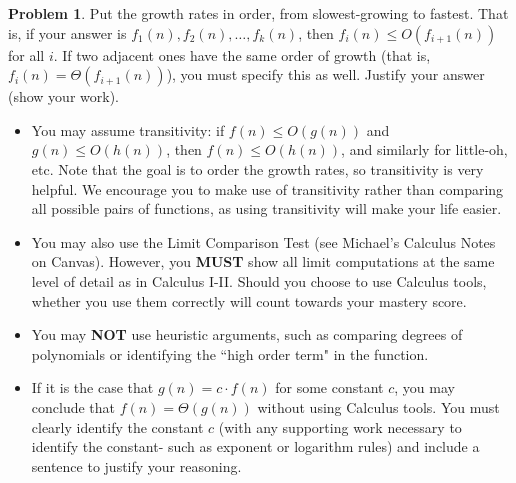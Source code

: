 \documentclass[11pt]{article}
\theoremstyle{definition}
\theoremstyle{definition}
\newtheorem{problem}{Problem}
\theoremstyle{definition}
\begin{document}
\begin{problem}
Put the growth rates in order, from slowest-growing to fastest. That is, if your answer is $f_1(n), f_2(n), \dotsc, f_k(n)$, then $f_i(n) \leq O(f_{i+1}(n))$ for all $i$. If two adjacent ones have the same order of growth (that is, $f_i(n) = \Theta(f_{i+1}(n))$), you must specify this as well. Justify your answer (show your work). 
\begin{itemize}
\item You may assume transitivity: if $f(n) \leq O(g(n))$ and $g(n) \leq O(h(n))$, then $f(n) \leq O(h(n))$, and similarly for little-oh, etc. Note that the goal is to order the growth rates, so transitivity is very helpful. We encourage you to make use of transitivity rather than comparing all possible pairs of functions, as using transitivity will make your life easier.

\item You may also use the Limit Comparison Test (see Michael's Calculus Notes on Canvas). However, you \textbf{MUST} show all limit computations at the same level of detail as in Calculus I-II. Should you choose to use Calculus tools, whether you use them correctly will count towards your mastery score.
\item You may \textbf{NOT} use heuristic arguments, such as comparing degrees of polynomials or identifying the ``high order term" in the function.
\item If it is the case that $g(n) = c \cdot f(n)$ for some constant $c$, you may conclude that $f(n) = \Theta(g(n))$ without using Calculus tools. You must clearly identify the constant $c$ (with any supporting work necessary to identify the constant- such as exponent or logarithm rules) and include a sentence to justify your reasoning. 
\end{itemize}
\end{problem}
\end{document}
